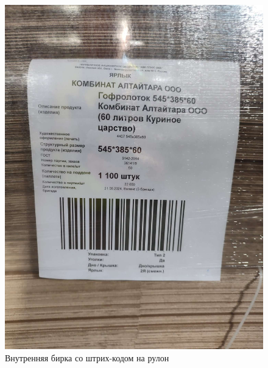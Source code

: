 









\begin{figure}
\begin{center}
  \includegraphics[height=0.94\textheight, width=\textwidth, keepaspectratio]{Pics/d_Label.JPEG}
\end{center}
  \caption{Внутренняя бирка со штрих-кодом на рулон}
  \label{pic:d_Label}
\end{figure}

